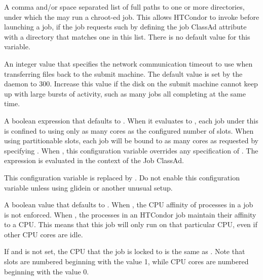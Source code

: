 \begin{description}
\label{param:NamedChroot} 
\item[\Macro{NAMED\_CHROOT}]
  A comma and/or space separated list of full paths to one or more directories,
  under which the  may run a chroot-ed job.
  This allows HTCondor to invoke  before launching a job,
  if the job requests such by defining the job ClassAd attribute
   with a directory that matches one in this list.
  There is no default value for this variable.

\label{param:StarterUploadTimeout} 
\item[\Macro{STARTER\_UPLOAD\_TIMEOUT}]
  An integer value that specifies the network communication timeout to use
  when transferring files back to the submit machine.  The default value is
  set by the  daemon to 300.
  Increase this value if the disk on the submit machine
  cannot keep up with large bursts of activity, such as many jobs all
  completing at the same time.

\label{param:AssignCpuAffinity} 
\item[\Macro{ASSIGN\_CPU\_AFFINITY}]
  A boolean expression that defaults to .
  When it evaluates to ,
  each job under this  is confined to using only as many
  cores as the configured number of slots.  When using partitionable
  slots, each job will be bound to as many cores as requested by
  specifying .
  When , this configuration variable overrides any specification
  of . The expression is evaluated in the
  context of the Job ClassAd.

\label{param:EnforceCpuAffinity} 
\item[\Macro{ENFORCE\_CPU\_AFFINITY}]
  This configuration variable is replaced by .
  Do not enable this configuration variable unless
  using glidein or another unusual setup.

  A boolean value that defaults to .  When ,
  the CPU affinity of processes in a job is not enforced.
  When , the processes in an HTCondor job maintain their
  affinity to a CPU.  This means that this job will only run on
  that particular CPU, even if other CPU cores are idle.

  If  and  is not set,
  the CPU that the job is locked to is the same as .
  Note that slots are numbered beginning with the value 1,
  while CPU cores are numbered beginning with the value 0.


\end{description}
